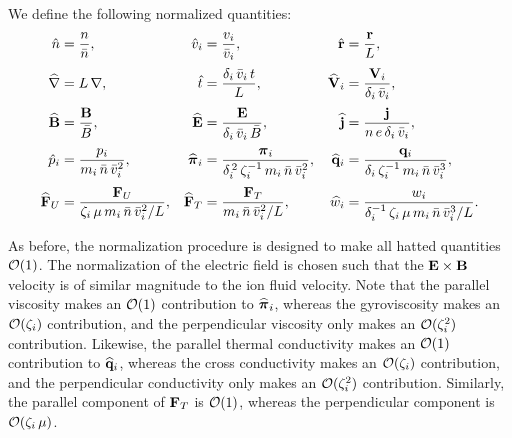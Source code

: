 \documentclass[notitlepage,12pt]{article}
\newcommand{\bpi}{\mbox{\boldmath$\pi$}}
\begin{document}
We
define the following normalized quantities: 
\begin{align}
\hat{n} &=\frac{ n}{\bar{n}},&
\hat{v}_i &= \frac{v_i}{\bar{v}_i},& 
\hat{\bf r} &= \frac{{\bf r}}{ L}, \nonumber\\[0.5ex]
\widehat{\nabla} &= L\,\nabla, &
\hat{t} &= \frac{\delta_i\,\bar{v}_i\,t}{L}, &
\widehat{\bf V}_i &= \frac{{\bf V}_i}{\delta_i\,\bar{v}_i}, \nonumber\\[0.5ex]
\widehat{\bf B}&= \frac{{\bf B}}{\bar{B}}, &
\widehat{\bf E} &= \frac{{\bf E}}{ \delta_i\,\bar{v}_i\,\bar{B}},&
\widehat{\bf j} &=\frac{{\bf j} }{ n\,e\,\delta_i\,\bar{v}_i},\nonumber\\[0.5ex]
 \hat{p}_i &=\frac{ p_i}{m_i\,\bar{n}\,\bar{v}_i^{2}}, &
 \widehat{\bpi}_i&= \frac{\bpi_i}{\delta_i^{\,2}\,\zeta_i^{-1}\,m_i\,\bar{n}\,\bar{v}_i^{2}}, &
\widehat{\bf q}_{i} &= \frac{{\bf q}_{i} }{ \delta_i\,\zeta_i^{-1}\,m_i\,\bar{n}\,\bar{v}_i^{3}},  \nonumber\\[0.5ex]
\widehat{\bf F}_U &= \frac{{\bf F}_U}{ \zeta_i\,\mu\,m_i\,\bar{n}\,\bar{v}_i^{2}/L}, &
\widehat{\bf F}_T &=\frac{ {\bf F}_T}{m_i\,\bar{n}\,\bar{v}_i^{2}/L},&
\widehat{w}_i& = \frac{w_i}{\delta_i^{-1}\,\zeta_i\,\mu\, m_i\,\bar{n}\,\bar{v}_i^{3}/L}.\nonumber
\end{align}

As before, the normalization procedure is designed to make all hatted quantities ${\cal O}(1)$.
The normalization of the electric field is chosen 
 such that the ${\bf E}\times{\bf B}$
velocity is of similar  magnitude to the ion fluid velocity. Note that the parallel viscosity
makes an ${\cal O}(1)$ contribution to $\widehat{\bpi}_i$, whereas the gyroviscosity
makes an ${\cal O}(\zeta_i)$ contribution, and the perpendicular viscosity only 
makes an ${\cal O}(\zeta_i^{2})$ contribution. Likewise, the parallel thermal
conductivity 
makes an ${\cal O}(1)$ contribution to $\widehat{\bf q}_{i}$, whereas the cross
conductivity 
makes an ${\cal O}(\zeta_i)$ contribution, and the perpendicular conductivity only 
makes an ${\cal O}(\zeta_i^{2})$ contribution. Similarly, the parallel component
of ${\bf F}_T$ is  ${\cal O}(1)$, whereas the perpendicular
component is  ${\cal O}(\zeta_i\,\mu)$. 
\end{document}
